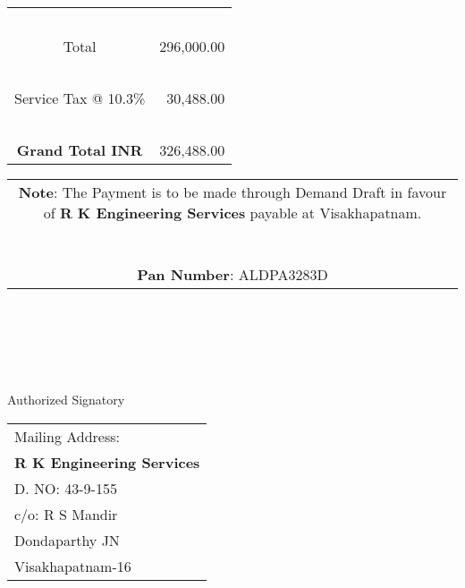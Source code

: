 \documentclass[11pt]{article}
\begin{document}
\vspace*{0.2cm}

\hspace*{13.15cm}
\begin{tabular}{|c|r|}
\hline
\ & \\
Total & 296,000.00 \\
\hline
\ & \\
Service Tax @ 10.3\% & 30,488.00 \\
\hline
\ & \\
{\bf Grand Total INR} & 326,488.00 \\
\hline
\end{tabular}

\vspace*{-1.75cm}
\noindent \begin{tabular}{c}
\parbox{4in}{ {\bf Note}: The Payment is to be made through Demand Draft in favour of {\bf R K Engineering Services} payable at Visakhapatnam. \\ \\ \\
{\noindent \bf Pan Number}:  ALDPA3283D }\\
\end{tabular}
\vspace*{95pt}


 \\ \\ \\ \\ \\
\noindent Authorized Signatory
\vspace*{-71pt}
\begin{flushright}
\begin{tabular}{l}
Mailing Address:\\
{\bf R K Engineering Services}\\
D. NO: 43-9-155\\
c/o: R  S Mandir\\
Dondaparthy JN\\ 
Visakhapatnam-16\\
\end{tabular}
\end{flushright}
\end{document}
